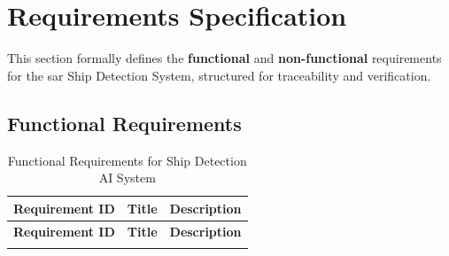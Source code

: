 \documentclass{article}
\begin{document}
\section{Requirements Specification}
This section formally defines the \textbf{functional} and \textbf{non-functional} requirements for the \acrshort{sar} Ship Detection System, structured for traceability and verification. \subsection{Functional Requirements}
\renewcommand{\arraystretch}{1.5} %

\begin{longtable}{>{\bfseries}p{4.5cm}p{3.5cm}p{6.5cm}}
\caption{Functional Requirements for Ship Detection AI System} \\
\hline
\textbf{Requirement ID} & \textbf{Title} & \textbf{Description} \\
\hline
\endfirsthead

\hline
\textbf{Requirement ID} & \textbf{Title} & \textbf{Description} \\
\hline
\endhead

\hline
\endfoot


\end{longtable}
\end{document}
